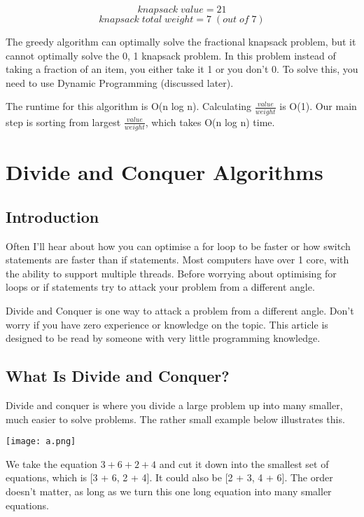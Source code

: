 \documentclass{article}
\begin{document}
$$knapsack \;value = 21$$
$$knapsack \;total \;weight = 7 \;(out \;of \;7)$$

The greedy algorithm can optimally solve the fractional knapsack problem, but it cannot optimally solve the {0, 1} knapsack problem. In this problem instead of taking a fraction of an item, you either take it {1} or you don't {0}. To solve this, you need to use Dynamic Programming (discussed later).

The runtime for this algorithm is O(n log n). Calculating $\frac{value}{weight}$ is O(1). Our main step is sorting from largest $\frac{value}{weight}$, which takes O(n log n) time.
\newpage
\section{Divide and Conquer Algorithms}
\subsection{Introduction}
Often I'll hear about how you can optimise a for loop to be faster or how switch statements are faster than if statements. Most computers have over 1 core, with the ability to support multiple threads. Before worrying about optimising for loops or if statements try to attack your problem from a different angle.

Divide and Conquer is one way to attack a problem from a different angle. Don't worry if you have zero experience or knowledge on the topic. This article is designed to be read by someone with very little programming knowledge.
\newpage
\subsection{What Is Divide and Conquer?}
Divide and conquer is where you divide a large problem up into many smaller, much easier to solve problems. The rather small example below illustrates this.
\begin{center}
\texttt{[image: a.png]}
\end{center}

We take the equation $3 + 6 + 2 + 4$ and cut it down into the smallest set of equations, which is [3 + 6, 2 + 4]. It could also be [2 + 3, 4 + 6]. The order doesn't matter, as long as we turn this one long equation into many smaller equations. 
\end{document}
